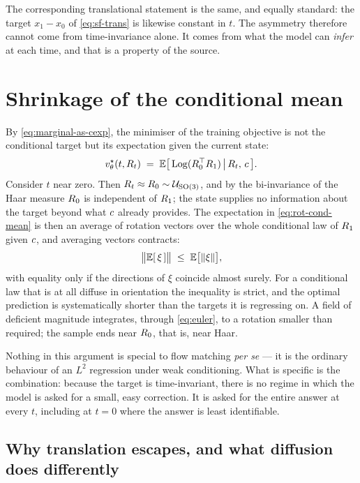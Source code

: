 The corresponding translational statement is the same, and equally standard:
the target $x_1 - x_0$ of \eqref{eq:sf-trans} is likewise constant in $t$. The
asymmetry therefore cannot come from time-invariance alone. It comes from what
the model can \emph{infer} at each time, and that is a property of the source.

\section{Shrinkage of the conditional mean}
\label{sec:shrinkage}

By \eqref{eq:marginal-as-cexp}, the minimiser of the training objective is not
the conditional target but its expectation given the current state:
\begin{equation}
  v_\theta^\star(t, R_t) \;=\;
  \mathbb{E}\bigl[\,\operatorname{Log}(R_0^\top R_1) \,\big|\, R_t,\, c \,\bigr].
  \label{eq:rot-cond-mean}
\end{equation}
Consider $t$ near zero. Then $R_t \approx R_0 \sim \mathcal{U}_{\mathrm{SO}(3)}$, and by the
bi-invariance of the Haar measure $R_0$ is independent of $R_1$;
the state supplies no information about the target beyond what $c$ already
provides. The expectation in \eqref{eq:rot-cond-mean} is then an average of
rotation vectors over the whole conditional law of $R_1$ given $c$, and
averaging vectors contracts:
\begin{equation}
  \bigl\|\mathbb{E}[\,\xi\,]\bigr\| \;\le\; \mathbb{E}\bigl[\|\xi\|\bigr],
  \label{eq:jensen}
\end{equation}
with equality only if the directions of $\xi$ coincide almost surely. For a
conditional law that is at all diffuse in orientation the inequality is
strict, and the optimal prediction is systematically shorter than the targets
it is regressing on. A field of deficient magnitude integrates, through
\eqref{eq:euler}, to a rotation smaller than required; the sample ends near
$R_0$, that is, near Haar.

Nothing in this argument is special to flow matching \emph{per se} --- it is
the ordinary behaviour of an $L^2$ regression under weak conditioning. What is
specific is the combination: because the target is time-invariant, there is no
regime in which the model is asked for a small, easy correction. It is asked
for the entire answer at every $t$, including at $t=0$ where the answer is
least identifiable.

\subsection{Why translation escapes, and what diffusion does differently}

